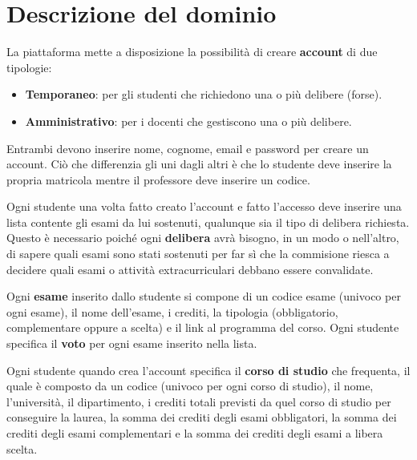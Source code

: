 \section{Descrizione del dominio}
La piattaforma mette a disposizione la possibilità di creare
\textbf{account} di due tipologie:
\begin{itemize}
	\item \textbf{Temporaneo}: per gli studenti che richiedono
	      una o più delibere (forse).
	\item \textbf{Amministrativo}: per i docenti che gestiscono
	      una o più delibere.
\end{itemize}
Entrambi devono inserire nome, cognome, email e password per
creare un account. Ciò che differenzia gli uni dagli altri è che
lo studente deve inserire la propria matricola mentre il
professore deve inserire un codice.

Ogni studente una volta fatto creato l'account e fatto l'accesso
deve inserire una lista contente gli esami da lui sostenuti,
qualunque sia il tipo di delibera richiesta. Questo è necessario
poiché ogni \textbf{delibera} avrà bisogno, in un modo o
nell'altro, di sapere quali esami sono stati sostenuti per far
sì che la commisione riesca a decidere quali esami o attività
extracurriculari debbano essere convalidate.

Ogni \textbf{esame} inserito dallo studente si compone di un
codice esame (univoco per ogni esame), il nome dell'esame, i
crediti, la tipologia (obbligatorio, complementare oppure a
scelta) e il link al programma del corso. Ogni studente
specifica il \textbf{voto} per ogni esame inserito nella lista.

Ogni studente quando crea l'account specifica il
\textbf{corso di studio} che frequenta, il quale è composto da
un codice (univoco per ogni corso di studio), il nome,
l'università, il dipartimento, i crediti totali previsti da
quel corso di studio per conseguire la laurea, la somma dei
crediti degli esami obbligatori, la somma dei crediti degli
esami complementari e la somma dei crediti degli esami a libera
scelta.

